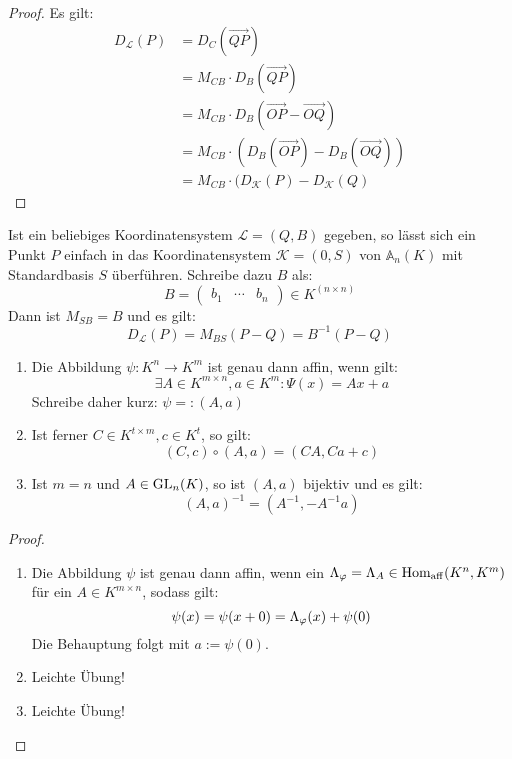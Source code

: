 \documentclass[parskip,a4paper,twoside,DIV15,BCOR12mm]{scrbook}
\begin{document}
\begin{proof}
Es gilt:
\begin{align*}
D_\mathcal{L}(P)&=D_C(\overrightarrow{QP})\\
&=M_{CB}\cdot D_B(\overrightarrow{QP})\\
&=M_{CB}\cdot D_B(\overrightarrow{OP}-\overrightarrow{OQ})\\
&=M_{CB}\cdot (D_B(\overrightarrow{OP})-D_B(\overrightarrow{OQ}))\\
&=M_{CB}\cdot(D_\mathcal{K}(P)-D_\mathcal{K}(Q)
\end{align*}
\end{proof}

\begin{application}
Ist ein beliebiges Koordinatensystem $\mathcal{L}=(Q,B)$ gegeben, so lässt sich ein 
Punkt $P$ einfach in das Koordinatensystem $\mathcal{K}=(0,S)$ von $\mathbb{A}_n(K)$ 
mit Standardbasis $S$ überführen. Schreibe dazu $B$ als:
\[B=\begin{pmatrix}b_1&\cdots &b_n\end{pmatrix}\in K^{(n\times n)}\]
Dann ist $M_{SB}=B$ und es gilt:
\[D_\mathcal{L}(P)=M_{BS}(P-Q)=B^{-1}(P-Q)\]
\end{application}

\begin{lemma}
\begin{enumerate}
\item Die Abbildung $\psi:K^n\to K^m$ ist genau dann affin, wenn gilt:
\[\exists A\in K^{m\times n},a\in K^m:\Psi(x)=Ax+a\]
Schreibe daher kurz: $\psi=:(A,a)$
\item Ist ferner $C\in K^{t\times m},c\in K^t$, so gilt:
\[(C,c)\circ(A,a)=(CA,Ca+c)\]
\item Ist $m=n$ und $A\in\operatorname{GL}_n(K)$, so ist $(A,a)$ bijektiv und es gilt:
\[(A,a)^{-1}=(A^{-1},-A^{-1}a)\]
\end{enumerate}
\end{lemma}

\begin{proof}
\begin{enumerate}
\item Die Abbildung $\psi$ ist genau dann affin, wenn ein $\Lambda_\varphi=\Lambda_A\in\operatorname{Hom_{aff}}
(K^n,K^m)$ für ein $A\in K^{m\times n}$, sodass gilt:
\[\psi(x)=\psi(x+0)=\Lambda_\varphi(x)+\psi(0)\]
Die Behauptung folgt mit $a:=\psi(0)$.
\item Leichte Übung!
\item Leichte Übung!
\end{enumerate}
\end{proof}
\end{document}
